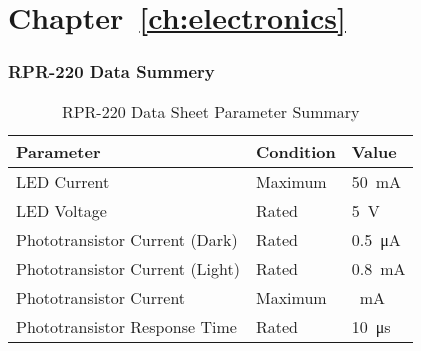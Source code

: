 
\section{Chapter~\ref{ch:electronics}}

\subsubsection{RPR-220 Data Summery}

\begin{table}[H]
	\renewcommand{\arraystretch}{\tablestretch}
	\centering
	\caption{RPR-220 Data Sheet Parameter Summary}
	\citep[2015]{RPR:2015}
	\begin{tabularx}{\textwidth}{X >{\raggedright}p{3cm} >{\raggedright\arraybackslash}p{2cm} }
		\toprule
		Parameter                       & Condition & Value                   \\
		\midrule
		LED Current                     & Maximum   & \SI{50}{\milli\ampere}  \\
		LED Voltage                     & Rated     & \SI{5}{\volt}           \\
		Phototransistor Current (Dark)  & Rated     & \SI{0.5}{\micro\ampere} \\
		Phototransistor Current (Light) & Rated     & \SI{0.8}{\milli\ampere} \\
		Phototransistor Current         & Maximum   & \SI{}{\milli\ampere}    \\
		Phototransistor Response Time   & Rated     & \SI{10}{\micro\second}  \\
		\bottomrule
	\end{tabularx}
	\label{tab:rprdata}
\end{table}

